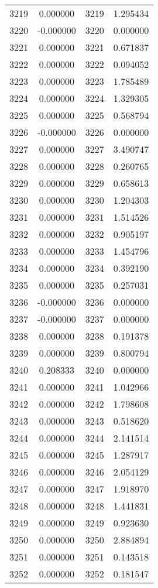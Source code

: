 \documentclass[12pt]{article}
\begin{document}
\begin{longtable}{@{}cccc@{}}
3219 & 0.000000 & 3219 & 1.295434 \\
3220 & -0.000000 & 3220 & 0.000000 \\
3221 & 0.000000 & 3221 & 0.671837 \\
3222 & 0.000000 & 3222 & 0.094052 \\
3223 & 0.000000 & 3223 & 1.785489 \\
3224 & 0.000000 & 3224 & 1.329305 \\
3225 & 0.000000 & 3225 & 0.568794 \\
3226 & -0.000000 & 3226 & 0.000000 \\
3227 & 0.000000 & 3227 & 3.490747 \\
3228 & 0.000000 & 3228 & 0.260765 \\
3229 & 0.000000 & 3229 & 0.658613 \\
3230 & 0.000000 & 3230 & 1.204303 \\
3231 & 0.000000 & 3231 & 1.514526 \\
3232 & 0.000000 & 3232 & 0.905197 \\
3233 & 0.000000 & 3233 & 1.454796 \\
3234 & 0.000000 & 3234 & 0.392190 \\
3235 & 0.000000 & 3235 & 0.257031 \\
3236 & -0.000000 & 3236 & 0.000000 \\
3237 & -0.000000 & 3237 & 0.000000 \\
3238 & 0.000000 & 3238 & 0.191378 \\
3239 & 0.000000 & 3239 & 0.800794 \\
3240 & 0.208333 & 3240 & 0.000000 \\
3241 & 0.000000 & 3241 & 1.042966 \\
3242 & 0.000000 & 3242 & 1.798608 \\
3243 & 0.000000 & 3243 & 0.518620 \\
3244 & 0.000000 & 3244 & 2.141514 \\
3245 & 0.000000 & 3245 & 1.287917 \\
3246 & 0.000000 & 3246 & 2.054129 \\
3247 & 0.000000 & 3247 & 1.918970 \\
3248 & 0.000000 & 3248 & 1.441831 \\
3249 & 0.000000 & 3249 & 0.923630 \\
3250 & 0.000000 & 3250 & 2.884894 \\
3251 & 0.000000 & 3251 & 0.143518 \\
3252 & 0.000000 & 3252 & 0.181547 \\

\end{longtable}
\end{document}
